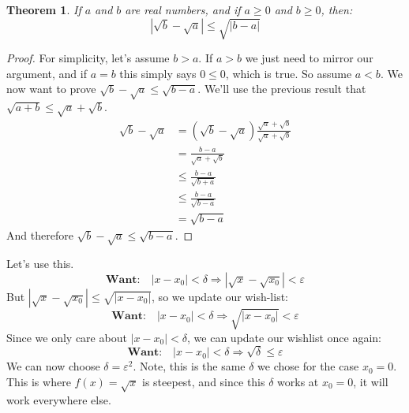 \documentclass{article}
\theoremstyle{normal}
\theoremstyle{plain}
\newtheorem{theorem}{Theorem}
\begin{document}
    \begin{theorem}
        If $a$ and $b$ are real numbers, and if $a\geq{0}$ and $b\geq{0}$,
        then:
        \begin{equation}
            |\sqrt{b}-\sqrt{a}|
            \leq\sqrt{|b-a|}
        \end{equation}
    \end{theorem}
    \begin{proof}
        For simplicity, let's assume $b>a$. If $a>b$ we just need to
        mirror our argument, and if $a=b$ this simply says $0\leq{0}$, which is
        true. So assume $a<b$. We now want to prove
        $\sqrt{b}-\sqrt{a}\leq\sqrt{b-a}$. We'll use the previous result
        that $\sqrt{a+b}\leq\sqrt{a}+\sqrt{b}$.
        \begin{align}
            \sqrt{b}-\sqrt{a}
            &=(\sqrt{b}-\sqrt{a})\frac{\sqrt{a}+\sqrt{b}}{\sqrt{a}+\sqrt{b}}\\
            &=\frac{b-a}{\sqrt{a}+\sqrt{b}}\\
            &\leq\frac{b-a}{\sqrt{b+a}}\\
            &\leq\frac{b-a}{\sqrt{b-a}}\\
            &=\sqrt{b-a}
        \end{align}
        And therefore $\sqrt{b}-\sqrt{a}\leq\sqrt{b-a}$.
    \end{proof}
    Let's use this.
    \begin{equation}
        \textbf{Want:}\quad
        |x-x_{0}|<\delta
        \Rightarrow
        |\sqrt{x}-\sqrt{x_{0}}|<\varepsilon
    \end{equation}
    But $|\sqrt{x}-\sqrt{x_{0}}|\leq\sqrt{|x-x_{0}|}$, so we update our
    wish-list:
    \begin{equation}
        \textbf{Want:}\quad
        |x-x_{0}|<\delta
        \Rightarrow
        \sqrt{|x-x_{0}|}<\varepsilon
    \end{equation}
    Since we only care about $|x-x_{0}|<\delta$, we can update our wishlist
    once again:
    \begin{equation}
        \textbf{Want:}\quad
        |x-x_{0}|<\delta
        \Rightarrow
        \sqrt{\delta}\leq\varepsilon
    \end{equation}
    We can now choose $\delta=\varepsilon^{2}$. Note, this is the same
    $\delta$ we chose for the case $x_{0}=0$. This is where $f(x)=\sqrt{x}$ is
    steepest, and since this $\delta$ works at $x_{0}=0$, it will work
    everywhere else.
    \par\hfill\par
\end{document}
